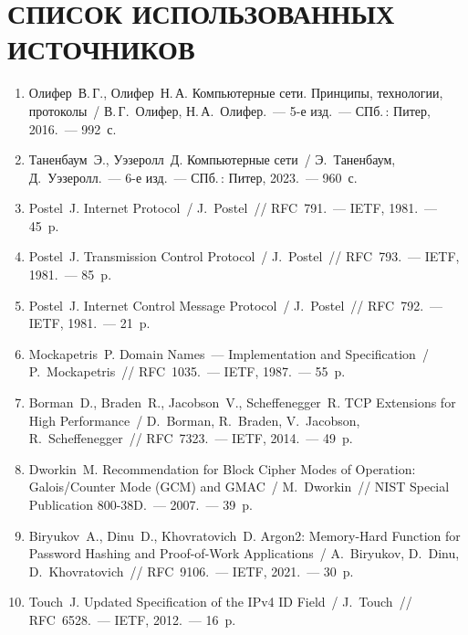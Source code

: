 \section*{СПИСОК ИСПОЛЬЗОВАННЫХ ИСТОЧНИКОВ}

\begin{enumerate}
  \item Олифер~В.\,Г., Олифер~Н.\,А. Компьютерные сети. Принципы, технологии, протоколы~/ В.\,Г.~Олифер, Н.\,А.~Олифер.~--- 5-е изд.~--- СПб.\,: Питер, 2016.~--- 992~с.

  \item Таненбаум~Э., Уэзеролл~Д. Компьютерные сети~/ Э.~Таненбаум, Д.~Уэзеролл.~--- 6-е изд.~--- СПб.\,: Питер, 2023.~--- 960~с.

  \item Postel~J. Internet Protocol~/ J.~Postel~// RFC~791.~--- IETF, 1981.~--- 45~p.

  \item Postel~J. Transmission Control Protocol~/ J.~Postel~// RFC~793.~--- IETF, 1981.~--- 85~p.

  \item Postel~J. Internet Control Message Protocol~/ J.~Postel~// RFC~792.~--- IETF, 1981.~--- 21~p.

  \item Mockapetris~P. Domain Names~--- Implementation and Specification~/ P.~Mockapetris~// RFC~1035.~--- IETF, 1987.~--- 55~p.

  \item Borman~D., Braden~R., Jacobson~V., Scheffenegger~R. TCP Extensions for High Performance~/ D.~Borman, R.~Braden, V.~Jacobson, R.~Scheffenegger~// RFC~7323.~--- IETF, 2014.~--- 49~p.

  \item Dworkin~M. Recommendation for Block Cipher Modes of Operation: Galois/Counter Mode (GCM) and GMAC~/ M.~Dworkin~// NIST Special Publication 800-38D.~--- 2007.~--- 39~p.

  \item Biryukov~A., Dinu~D., Khovratovich~D. Argon2: Memory-Hard Function for Password Hashing and Proof-of-Work Applications~/ A.~Biryukov, D.~Dinu, D.~Khovratovich~// RFC~9106.~--- IETF, 2021.~--- 30~p.

  \item Touch~J. Updated Specification of the IPv4 ID Field~/ J.~Touch~// RFC~6528.~--- IETF, 2012.~--- 16~p.


\end{enumerate}
